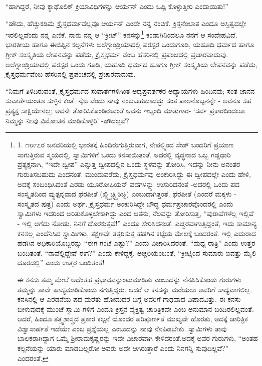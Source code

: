 “ಹಾಗಿದ್ದರೆ, ನೀವು ಕ್ಯಾಥೊಲಿಕ್ ಕ್ರಿಯಾವಿಧಿಗಳನ್ನು ಆರ್ಯನ್ ಎಂದು ಒಪ್ಪಿ ಕೊಳ್ಳುತ್ತೀರಿ ಎಂದಾಯಿತು!”

“ಹೌದು, ಹೆಚ್ಚುಕಡಿಮೆ ಕ್ರೈಸ್ತಧರ್ಮವೆಲ್ಲವೂ ಆರ್ಯನ್ ಎಂದೇ ನನ್ನ ನಂಬಿಕೆ. ಕ್ರಿಸ್ತನೆಂಬಾತ ಎಂದೂ ಅಸ್ತಿತ್ವದಲ್ಲೇ ಇರಲಿಲ್ಲವೆಂದು ನನ್ನ ಎಣಿಕೆ. ನಾನು ನನ್ನ ಆ “ಕ್ರೀಟ್” ಕನಸನ್ನು\footnote{1. ೧೮೯೭ರ ಜನವರಿಯಲ್ಲಿ ಭಾರತಕ್ಕೆ ಹಿಂದಿರುಗುತ್ತಿರುವಾಗ, ನೇಪಲ್ಸ್ನಿಂದ ಸೇಡ್ ಬಂದರಿಗೆ ಪ್ರಯಾಣ ಸಾಗುತ್ತಿರುವ ಸ್ಮಯದಲ್ಲಿ, ಸ್ವಾಮಿಗಳಿಗೆ ಒಂದು ಕನಸಾಯಿತಂತೆ. ಅದರಲ್ಲಿ ವೃದ್ಧನಾದ ಒಬ್ಬ ಗಡ್ಡಧಾರಿ ಪ್ರತ್ಯಕ್ಷನಾಗಿ, “ಇದೇ ದ್ವೀಪ” ಎನ್ನುತ್ತ ದ್ವೀಪದಲ್ಲಿನ ಒಂದು ಸ್ಥಳವನ್ನು ತೋರಿಸಿ, ಇದನ್ನು ನೀನು ಅನಂತರ ಗುರುತಿಸಬಹುದು ಎಂದನಂತೆ. ಮುಂದುವರೆದು, ಕ್ರೈಸ್ತಧರ್ಮವು ಅಂಕುರಿಸಿದ್ದು ಈ ದ್ವೀಪದಲ್ಲೇ ಎಂದು ಹೇಳಿ, ಅದಕ್ಕೆ ಸಂಬಂಧಿಸಿದಂತೆ ಎರಡು ಯೂರೋಪಿಯನ್ ಪದಗಳನ್ನ್ನು ಉಸುರಿದನಂತೆ -ಅದರಲ್ಲಿ ಒಂದು ಪದ ಸಂಸ್ಕೃತದಿಂದ ವ್ಯುತ್ಪನ್ನವಾದ ಥೆರಪೀತೆ (ಖ್ಜ್ಛ್ಟಿಚ್ಟ್ಛ್ಠಿಠಿಚ್ಛಿ) ಎಂಬುದಾಗಿತ್ತಂತೆ. ಥೆರಪೀತೆ (ಎಂದರೆ ಮಕ್ಕಳು - ಸಂಸ್ಕೃತದ ಪುತ್ರ) ಎಂದು ಅರ್ಥ. ಕ್ರೈಸ್ತಧರ್ಮ ಅಂಕುರಿಸಿದ್ದೇ ಬೌದ್ಧ ಧರ್ಮಪ್ರಚಾರವೊಂದರಲ್ಲಿ ಎಂದು ಸ್ವಾಮಿಗಳು ಇದರಿಂದ ಅರಿತುಕೊಳ್ಳಬೇಕಾಗಿದ್ದು ಎಂದ ಆತನು, ನೆಲವನ್ನು ತೋರಿಸುತ್ತ, “ಪುರಾವೆಗಳೆಲ್ಲ ಇಲ್ಲಿವೆ - ಇಲ್ಲಿ ಅಗೆದು ನೋಡು, ನಿನಗೆ ದೊರಕುತ್ತವೆ!” ಎಂದೂ ಸೇರಿಸಿದನಂತೆ. ಎಚ್ಚರವಾಗುತ್ತಿದ್ದಂತೆ, ಇದು ಸಾಮಾನ್ಯ ಕನಸಲ್ಲ ಎಂದೆನಿಸಿದ ಸ್ವಾಮಿಗಳು, ತಕ್ಷಣವೇ ತತ್ತರಿಸುತ್ತ ಹಡಗಿನ ಕಟ್ಟೆಯ ಮೇಲಕ್ಕೆ ಬಂದರಂತೆ. ಇಲ್ಲಿ ಎದುರಾದ ಹಡಗಿನ ಅಧಿಕಾರಿಯೊಬ್ಬರನ್ನು “ಈಗ ಗಂಟೆ ಎಷ್ಟು?” ಎಂದು ವಿಚಾರಿಸಿದರಂತೆ. “ಮಧ್ಯ ರಾತ್ರಿ” ಎಂದು ಉತ್ತರ ಬಂದಿತಂತೆ. “ನಾವೆಲ್ಲಿದ್ದೇವೆ ಈಗ?” ಎಂದು ಕೇಳಿದ್ದಕ್ಕೆ, ಅಚ್ಚರಿಯೆಂಬಂತೆ, “ಕ್ರೀಟ್ನಿಂದ ಸುಮಾರು ಐವತ್ತು ಮೈಲಿ ದೂರದಲ್ಲಿ” ಎಂದು ಉತ್ತರ ಬಂದಿತಂತೆ!

ಈ ಕನಸು ತಮ್ಮ ಮೇಲೆ ಅದೆಂತಹ ಪ್ರಭಾವವನ್ನುಂಟುಮಾಡಿತು ಎಂಬುದನ್ನು ನೆನಪಿಸಿಕೊಂಡು ಗುರುಗಳು ತಮ್ಮನ್ನು ತಾವೇ ಹಾಸ್ಯಮಾಡಿಕೊಂಡು ನಗುತ್ತಿದ್ದರು. ಆದರೆ ಆ ಕನಸನ್ನು ಮರೆಯಲು ಅವರಿಗೆ ಸಾಧ್ಯವಾಗಲಿಲ್ಲ. ಕನಸಿನಲ್ಲಿ ಆ ಎರಡನೆಯ ಪದ ಮರೆತು ಹೋದುದರ ಬಗ್ಗೆ ಅವರಿಗೆ ಗಾಢವಾದ ವಿಷಾದವಿತ್ತು. ಈ ಕನಸು ಬೀಳುವುದಕ್ಕೆ ಮುಂಚೆ ಸ್ವಾಮಿ ಗಳಿಗೆ ಎಂದೂ ಕ್ರಿಸ್ತನ ವ್ಯಕ್ತಿತ್ವ ಚಾರಿತ್ರಿಕವೇ ಎಂಬ ಅನುಮಾನ ಬಂದಿರಲಿಲ್ಲವಂತೆ. ಆದರೆ, ಹಿಂದೂ ತತ್ತ್ವಶಾಸ್ತ್ರದ ಪ್ರಕಾರ ಕಲ್ಪನೆ ಯೊಂದರ ಪರಿಪೂರ್ಣತೆ ಮುಖ್ಯವೇ ಹೊರತು, ಅದಕ್ಕೆ ಚಾರಿತ್ರಿಕ ವಿಶ್ವಾಸಾರ್ಹತೆ ಇದೆಯೇ ಎಂಬ ಪ್ರಶ್ನೆಯಲ್ಲ ಎಂಬುದನ್ನು ನಾವು ನೆನಪಿಡಬೇಕು. ಸ್ವಾಮಿಗಳು ತಾವು ಬಾಲಕರಾಗಿದ್ದಾಗ ಒಮ್ಮೆ ಶ‍್ರೀರಾಮಕೃಷ್ಣರನ್ನು ಇದೇ ವಿಚಾರವಾಗಿ ಕೇಳಿದರಂತೆ.ಅದಕ್ಕೆ ಅವರ ಗುರುಗಳು, “ಅಂತಹ ಕಲ್ಪನೆಯನ್ನು ಯಾರು ಮಾಡಬಲ್ಲರೋ ಅವರು ಅದೇ ಆಗಿರುತ್ತಾರೆ ಎಂದು ನಿನಗನ್ನಿ ಸುವುದಿಲ್ಲವೆ?” ಎಂದರಂತೆ.} ಕಂಡಾಗಿನಿಂದಲೂ ನನಗೆ ಆ ಸಂದೇಹವಿದೆ. ಭಾರತೀಯ ಹಾಗೂ ಈಜಿಪ್ಟಿನ ಕಲ್ಪನೆಗಳು ಅಲೆಗ್ಸಾಂಡ್ರಿಯಾದಲ್ಲಿ ಪರಸ್ಪರ ಒಂದುಗೂಡಿ, ಯಹೂದಿ ಧರ್ಮದ ಹಾಗೂ ಗ್ರೀಕ್ ಸಂಸ್ಕೃತಿಯ ಲೇಪನವನ್ನು ಪಡೆದು, ಕ್ರೈಸ್ತಧರ್ಮ ವೆಂಬ ಹೆಸರಿನಲ್ಲಿ ಪ್ರಪಂಚದಲ್ಲಿ ಪ್ರಚಾರವಾದುವು. ಅಲೆಗ್ಸಾಂಡ್ರಿಯಾದಲ್ಲಿ ಪರಸ್ಪರ ಒಂದು ಗೂಡಿ, ಯಹೂದಿ ಧರ್ಮದ ಹೂಗೂ ಗ್ರೀಕ್ ಸಂಸ್ಕೃತಿಯ ಲೇಪನವನ್ನು ಪಡೆದು, ಕ್ರೈಸ್ತಧರ್ಮವೆಂಬ ಹೆಸರಿನಲ್ಲಿ ಪ್ರಪಂಚದಲ್ಲಿ ಪ್ರಚಾರವಾದುವು.

“ನಿಮಗೆ ತಿಳಿದಿರುವಂತೆ, ಕ್ರೈಸ್ತಧರ್ಮದ ಸುವಾರ್ತೆಗಳಿಗಿಂತ ಆದ್ಯಪ್ರವರ್ತಕರ ಅಧ್ಯಾಯಗಳು ಹಿಂದಿನವು; ಸಂತ ಜಾನನ ಸುವಾರ್ತೆಯಂತೂ ಸುಳ್ಳಿನ ಕಂತೆ. ನೈಜ ವೆಂದು ನಾವು ನಂಬಬಹುದಾದದ್ದು ಸಂತ ಪಾಲನೊಬ್ಬನನ್ನೇ - ಅವನೂ ಸಹ ಪ್ರತ್ಯಕ್ಷ ಸಾಕ್ಷಿಯೇನಲ್ಲ; ಅವನೇ ತೋರಿಸಿಕೊಂಡಿರುವಂತೆ ಅವನು ಇಬ್ಬಂದಿ ಮಾತುಗಾರ- ‘ಸರ್ವ ಪ್ರಕಾರದಿಂದಲೂ ನಿಮ್ಮನ್ನು ನೀವು ವಿಮೋಚನೆ ಮಾಡಿಕೊಳ್ಳಿರಿ’ -ಹೌದಲ್ಲವೆ?


